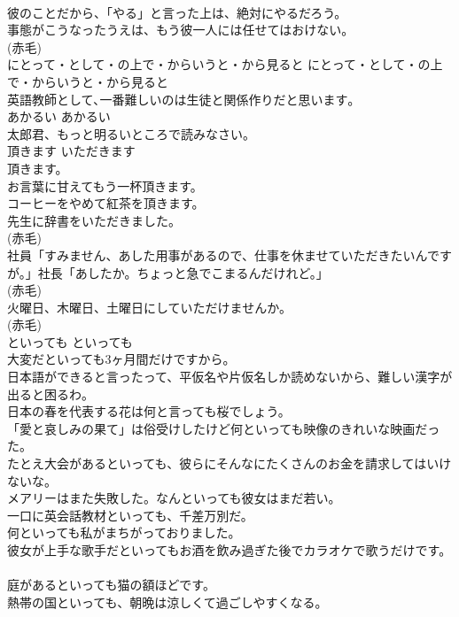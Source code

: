 \documentclass[8pt]{extreport}
\begin{document}
\begin{CJK}{UTF8}{min}
\\	彼のことだから、「やる」と言った上は、絶対にやるだろう。   
\\	事態がこうなったうえは、もう彼一人には任せてはおけない。  
\\	(赤毛)
\\	にとって・として・の上で・からいうと・から見ると	にとって・として・の上で・からいうと・から見ると	
\\	英語教師として､一番難しいのは生徒と関係作りだと思います｡   
\\	あかるい	あかるい	
\\	太郎君、もっと明るいところで読みなさい。  
\\	頂きます	いただきます	
\\	頂きます。  
\\	お言葉に甘えてもう一杯頂きます。  
\\	コーヒーをやめて紅茶を頂きます。  
\\	先生に辞書をいただきました。  
\\	(赤毛)
\\	社員「すみません、あした用事があるので、仕事を休ませていただきたいんですが。」社長「あしたか。ちょっと急でこまるんだけれど。」  
\\	(赤毛)
\\	火曜日、木曜日、土曜日にしていただけませんか。  
\\	(赤毛)
\\	といっても	といっても	
\\	大変だといっても3ヶ月間だけですから。  
\\	日本語ができると言ったって、平仮名や片仮名しか読めないから、難しい漢字が出ると困るわ。  
\\	日本の春を代表する花は何と言っても桜でしょう。  
\\	「愛と哀しみの果て」は俗受けしたけど何といっても映像のきれいな映画だった。   
\\	たとえ大会があるといっても、彼らにそんなにたくさんのお金を請求してはいけないな。   
\\	メアリーはまた失敗した。なんといっても彼女はまだ若い。   
\\	一口に英会話教材といっても、千差万別だ。   
\\	何といっても私がまちがっておりました。  
\\	彼女が上手な歌手だといってもお酒を飲み過ぎた後でカラオケで歌うだけです。   
\\	庭があるといっても猫の額ほどです。  
\\	熱帯の国といっても、朝晩は涼しくて過ごしやすくなる。  

\end{CJK}
\end{document}
